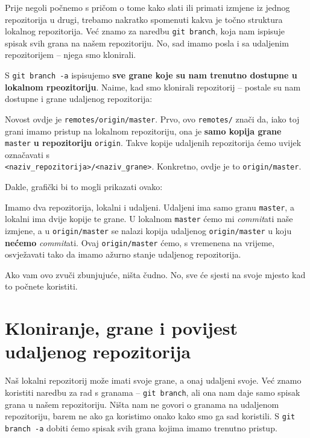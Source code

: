 Prije negoli počnemo s pričom o tome kako slati ili primati izmjene iz jednog repozitorija u drugi, trebamo nakratko spomenuti kakva je točno struktura lokalnog repozitorija.
Već znamo za naredbu \verb+git branch+, koja nam ispisuje spisak svih grana na našem repozitoriju.
No, sad imamo posla i sa udaljenim repozitorijem -- njega smo klonirali.

S \verb+git branch -a+ ispisujemo \textbf{sve grane koje su nam trenutno dostupne u lokalnom rpeozitoriju}.
Naime, kad smo klonirali repozitorij -- postale su nam dostupne i grane udaljenog repozitorija:



Novost ovdje je \verb+remotes/origin/master+.
Prvo, ovo \verb+remotes/+ znači da, iako toj grani imamo pristup na lokalnom repozitoriju, ona je \textbf{samo kopija grane} \verb+master+ \textbf{u repozitoriju} \verb+origin+.
Takve kopije udaljenih repozitorija ćemo uvijek označavati s \\ \verb+<naziv_repozitorija>/<naziv_grane>+.
Konkretno, ovdje je to \verb+origin/master+.

Dakle, grafički bi to mogli prikazati ovako:



Imamo dva repozitorija, lokalni i udaljeni.
Udaljeni ima samo granu \verb+master+, a lokalni ima dvije kopije te grane. 
U lokalnom \verb+master+ ćemo mi \emph{commit}ati naše izmjene, a u \verb+origin/master+ se nalazi kopija udaljenog \verb+origin/master+ u koju \textbf{nećemo} \emph{commit}ati.
Ovaj \verb+origin/master+ ćemo, s vremenena na vrijeme, osvježavati tako da imamo ažurno stanje udaljenog repozitorija.

Ako vam ovo zvuči zbunjujuće, ništa čudno.
No, sve će sjesti na svoje mjesto kad to počnete koristiti.

\section*{Kloniranje, grane i povijest udaljenog repozitorija}

Naš lokalni repozitorij može imati svoje grane, a onaj udaljeni svoje.
Već znamo koristiti naredbu za rad s granama -- \verb+git branch+, ali ona nam daje samo spisak grana u našem repozitoriju.
Ništa nam ne govori o granama na udaljenom repozitoriju, barem ne ako ga koristimo onako kako smo ga sad koristili.
S \verb+git branch -a+ dobiti ćemo spisak svih grana kojima imamo trenutno pristup.

